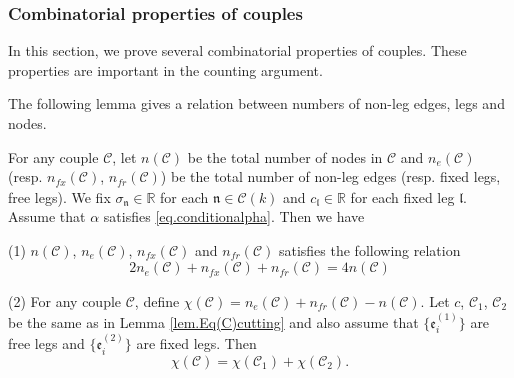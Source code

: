 \subsubsection{Combinatorial properties of couples} In this section, we prove several combinatorial properties of couples. These properties are important in the counting argument.

The following lemma gives a relation between numbers of non-leg edges, legs and nodes.

\begin{lem}\label{prop.countingind}
For any couple $\mathcal{C}$, let $n(\mathcal{C})$ be the total number of nodes in $\mathcal{C}$ and $n_e(\mathcal{C})$ (resp. $n_{fx}(\mathcal{C})$, $n_{\textit{fr}}(\mathcal{C})$) be the total number of non-leg edges (resp. fixed legs, free legs). We fix $\sigma_{\mathfrak{n}}\in\mathbb{R}$ for each $\mathfrak{n}\in \mathcal{C}(k)$ and $c_{\mathfrak{l}}\in \mathbb{R}$ for each fixed leg $\mathfrak{l}$. Assume that $\alpha$ satisfies \eqref{eq.conditionalpha}. Then we have

(1) $n(\mathcal{C})$, $n_e(\mathcal{C})$, $n_{fx}(\mathcal{C})$ and $n_{\textit{fr}}(\mathcal{C})$ satisfies the following relation
\begin{equation}
    2n_e(\mathcal{C})+n_{fx}(\mathcal{C})+n_{\textit{fr}}(\mathcal{C})=4n(\mathcal{C})
\end{equation}

(2) For any couple $\mathcal{C}$, define $\chi(\mathcal{C})=n_e(\mathcal{C})+n_{\textit{fr}}(\mathcal{C})-n(\mathcal{C})$. Let $c$, $\mathcal{C}_1$, $\mathcal{C}_2$ be the same as in Lemma \ref{lem.Eq(C)cutting} and also assume that $\{\mathfrak{e}_{i}^{(1)}\}$ are free legs and $\{\mathfrak{e}_{i}^{(2)}\}$ are fixed legs. Then 
\begin{equation}
    \chi(\mathcal{C})=\chi(\mathcal{C}_1)+\chi(\mathcal{C}_2).
\end{equation}

\end{lem}

